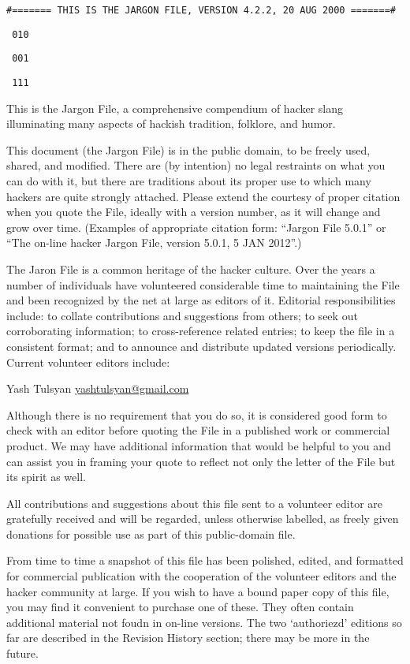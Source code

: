 \texttt{\#======= THIS IS THE JARGON FILE, VERSION 4.2.2, 20 AUG 2000 =======\#}

\texttt{\ 010}

\texttt{\ 001}

\texttt{\ 111}
\setlength{\parskip}{6pt}

This is the Jargon File, a comprehensive compendium of hacker slang illuminating many aspects of hackish tradition, folklore, and humor.

This document (the Jargon File) is in the public domain, to be freely used, shared, and modified. There are (by intention) no legal
restraints on what you can do with it, but there are traditions about its proper use to which many hackers are quite strongly attached.
Please extend the courtesy of proper citation when you quote the File, ideally with a version number, as it will change and grow over time.
(Examples of appropriate citation form: ``Jargon File 5.0.1'' or ``The on-line hacker Jargon File, version 5.0.1, 5 JAN 2012''.)

The Jaron File is a common heritage of the hacker culture. Over the years a number of individuals have volunteered considerable time to
maintaining the File and been recognized by the net at large as editors of it. Editorial responsibilities include: to collate contributions
and suggestions from others; to seek out corroborating information; to cross-reference related entries; to keep the file in a consistent
format; and to announce and distribute updated versions periodically. Current volunteer editors include:

Yash Tulsyan \url{yashtulsyan@gmail.com}

Although there is no requirement that you do so, it is considered good form to check with an editor before quoting the File in a published
work or commercial product. We may have additional information that would be helpful to you and can assist you in framing your quote to
reflect not only the letter of the File but its spirit as well.

All contributions and suggestions about this file sent to a volunteer editor are gratefully received and will be regarded, unless otherwise
labelled, as freely given donations for possible use as part of this public-domain file.

From time to time a snapshot of this file has been polished, edited, and formatted for commercial publication with the cooperation of the
volunteer editors and the hacker community at large. If you wish to have a bound paper copy of this file, you may find it convenient to
purchase one of these. They often contain additional material not foudn in on-line versions. The two `authoriezd' editions so far are
described in the Revision History section; there may be more in the future.


